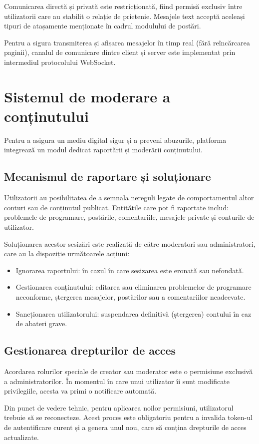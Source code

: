 Comunicarea directă și privată este restricționată, fiind permisă exclusiv între utilizatorii care au stabilit o relație de prietenie. Mesajele text acceptă aceleași tipuri de atașamente menționate în cadrul modulului de postări. 

Pentru a sigura transmiterea și afișarea mesajelor în timp real (fără reîncărcarea paginii), canalul de comunicare dintre client și server este implementat prin intermediul protocolului WebSocket.

\section{Sistemul de moderare a conținutului}

Pentru a asigura un mediu digital sigur și a preveni abuzurile, platforma integrează un modul dedicat raportării și moderării conținutului.

\subsection{Mecanismul de raportare și soluționare}

Utilizatorii au posibilitatea de a semnala nereguli legate de comportamentul altor conturi sau de conținutul publicat. Entitățile care pot fi raportate includ: problemele de programare, postările, comentariile, mesajele private și conturile de utilizator. 

Soluționarea acestor sesizări este realizată de către moderatori sau administratori, care au la dispoziție următoarele acțiuni:

\begin{itemize}
    \item Ignorarea raportului: în cazul în care sesizarea este eronată sau nefondată.
    \item Gestionarea conținutului: editarea sau eliminarea problemelor de programare neconforme, ștergerea mesajelor, postărilor sau a comentariilor neadecvate.
    \item Sancționarea utilizatorului: suspendarea definitivă (ștergerea) contului în caz de abateri grave.
\end{itemize}

\subsection{Gestionarea drepturilor de acces}

Acordarea rolurilor speciale de creator sau moderator este o permisiune exclusivă a administratorilor. În momentul în care unui utilizator îi sunt modificate privilegiile, acesta va primi o notificare automată.

Din punct de vedere tehnic, pentru aplicarea noilor permisiuni, utilizatorul trebuie să se reconecteze. Acest proces este obligatoriu pentru a invalida token-ul de autentificare curent și a genera unul nou, care să conțina drepturile de acces actualizate. 